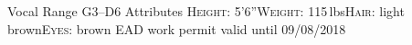 \begin{cvskills}
  \cvskill
    {Vocal Range}%
    {G3--D6}%
  \cvskill
    {Attributes}%
    {{\scshape Height}: 5'6''{\enskip\cdotp\enskip}{\scshape Weight}: 115\,lbs{\enskip\cdotp\enskip}{\scshape Hair}: light brown{\enskip\cdotp\enskip}{\scshape Eyes}: brown}%
  \cvskill
    {EAD}
    {work permit valid until 09/08/2018}
\end{cvskills}

